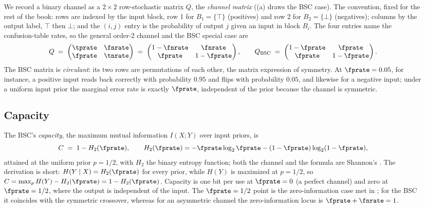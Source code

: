 We record a binary channel as a $2 \times 2$ row-stochastic matrix $Q$, the
\emph{channel matrix}
((a) draws the BSC case). The convention, fixed for the rest of the book: rows are
indexed by the input block, row 1 for $B_1 = \{\top\}$ (positives) and row 2
for $B_2 = \{\bot\}$ (negatives); columns by the output label, $\top$ then
$\bot$; and the $(i,j)$ entry is the probability of output $j$ given an input in
block $B_i$. The four entries name the confusion-table rates, so the general
order-2 channel and the BSC special case are
\[
  Q \;=\;
  \begin{pmatrix}
    \tprate & \fnrate \\
    \fprate & \tnrate
  \end{pmatrix}
  \;=\;
  \begin{pmatrix}
    1 - \fnrate & \fnrate \\
    \fprate & 1 - \fprate
  \end{pmatrix},
  \qquad
  Q_{\mathrm{BSC}} \;=\;
  \begin{pmatrix}
    1 - \fprate & \fprate \\
    \fprate & 1 - \fprate
  \end{pmatrix}.
\]
The BSC matrix is \emph{circulant}: its two rows are permutations of each
other, the matrix expression of symmetry. At $\fprate = 0.05$, for instance, a
positive input reads back correctly with probability $0.95$ and flips with
probability $0.05$, and likewise for a negative input; under a uniform input
prior the marginal error rate is exactly $\fprate$, independent of the prior
because the channel is symmetric.

\subsection*{Capacity}

The BSC's \emph{capacity}, the maximum mutual
information $I(X; Y)$ over input priors, is
\[
  C \;=\; 1 - H_2(\fprate),
  \qquad
  H_2(\fprate) = -\fprate \log_2 \fprate - (1 - \fprate)\log_2(1 - \fprate),
\]
attained at the uniform prior $p = 1/2$, with $H_2$ the binary entropy
function; both the channel and the formula are
Shannon's \parencite{shannon-1948}. The derivation is short: $H(Y \mid X) =
H_2(\fprate)$ for every prior, while $H(Y)$ is maximized at $p = 1/2$, so
$C = \max_p H(Y) - H_2(\fprate) = 1 - H_2(\fprate)$. Capacity is one bit per use
at $\fprate = 0$ (a perfect channel) and zero at $\fprate = 1/2$, where the
output is independent of the input. The $\fprate = 1/2$ point is the
zero-information case met in ; for the BSC it
coincides with the symmetric crossover, whereas for an asymmetric channel the
zero-information locus is $\fprate + \fnrate = 1$.

